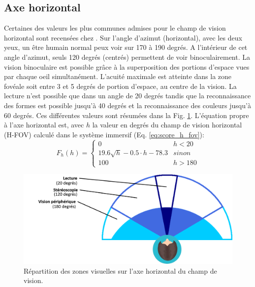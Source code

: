 	\subsection{Axe horizontal}
	\par Certaines des valeurs les plus communes admises pour le champ de vision horizontal sont recensées chez \citep{devisme_optimisation_2004}. Sur l'angle d'azimut (horizontal), avec les deux yeux, un être humain normal peux voir sur 170 à 190 degrés. A l'intérieur de cet angle d'azimut, seuls 120 degrés (centrés) permettent de voir binoculairement. La vision binoculaire est possible grâce à la superposition des portions d'espace vues par chaque oeil simultanément. L'acuité maximale est atteinte dans la zone fovéale soit entre 3 et 5 degrés de portion d'espace, au centre de la vision. La lecture n'est possible que dans un angle de 20 degrés tandis que la reconnaissance des formes est possible jusqu'à 40 degrés et la reconnaissance des couleurs jusqu'à 60 degrés. Ces différentes valeurs sont résumées dans la Fig. \ref{fig:champ_vision_horizontal}. L'équation propre à l'axe horizontal est, avec $h$ la valeur en degrés du champ de vision horizontal (H-FOV) calculé dans le système immersif (Eq. \ref{eq:score_h_fov}):
	\begin{equation}
	F_h(h) = \begin{cases}
		0 & h < 20\\
		19.6 \sqrt{h} -0.5 \cdot h -78.3 & sinon\\
		100 & h > 180
	\end{cases}
	\label{eq:score_h_fov}
	\end{equation}
	
	\begin{figure}
		\centering
		\includegraphics[scale=.5]{Figures/ChampVisionHorizontal}
		\caption{Répartition des zones visuelles sur l'axe horizontal du champ de vision.}
		\label{fig:champ_vision_horizontal}
	\end{figure}

